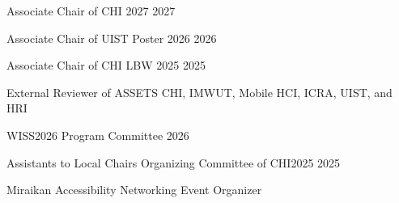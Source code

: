 

\begin{cvhonors}

  \cvhonor
    {Associate Chair of CHI 2027}
    {}
    {}
    {2027}

  \cvhonor
    {Associate Chair of UIST Poster 2026}
    {}
    {}
    {2026}

  \cvhonor
    {Associate Chair of CHI LBW 2025}
    {}
    {}
    {2025}

  \cvhonor
    {External Reviewer of ASSETS}
    {CHI, IMWUT, Mobile HCI, ICRA, UIST, and HRI}
    {}
    {}

\end{cvhonors}


\begin{cvhonors}

  \cvhonor
    {WISS2026 Program Committee}
    {}
    {}
    {2026}

  \cvhonor
    {Assistants to Local Chairs}
    {Organizing Committee of CHI2025}
    {}
    {2025}

  \cvhonor
    {Miraikan Accessibility Networking Event Organizer}
    {}
    {}
    {}

\end{cvhonors}
